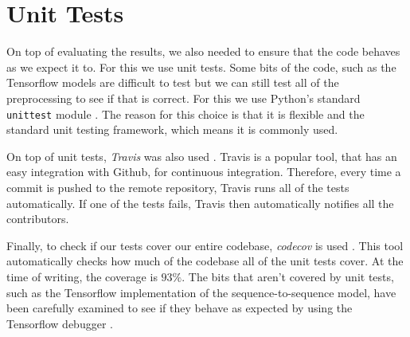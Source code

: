 

\section{Unit Tests}

On top of evaluating the results, we also needed to ensure that the code behaves as we expect it to.
For this we use unit tests.
Some bits of the code, such as the Tensorflow models are difficult to test but we can still test all of the preprocessing to see if that is correct.
For this we use Python's standard \texttt{unittest} module \cite{python_unittest_documentation}.
The reason for this choice is that it is flexible and the standard unit testing framework, which means it is commonly used.

On top of unit tests, \textit{Travis} was also used \cite{travis}.
Travis is a popular tool, that has an easy integration with Github, for continuous integration.
Therefore, every time a commit is pushed to the remote repository, Travis runs all of the tests automatically.
If one of the tests fails, Travis then automatically notifies all the contributors.

Finally, to check if our tests cover our entire codebase, \textit{codecov} is used \cite{codecov}.
This tool automatically checks how much of the codebase all of the unit tests cover.
At the time of writing, the coverage is $93\%$.
The bits that aren't covered by unit tests, such as the Tensorflow implementation of the sequence-to-sequence model, have been carefully examined to see if they behave as expected by using the Tensorflow debugger \cite{tensorflow}.
